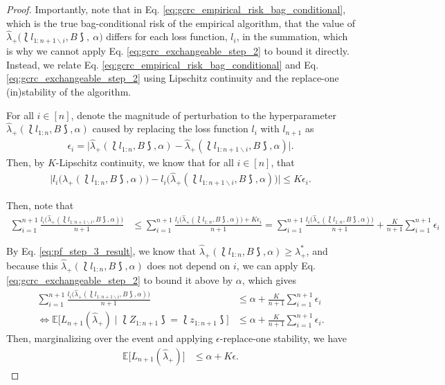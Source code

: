 \begin{proof}
Importantly, note that in Eq. 
\eqref{eq:gcrc_empirical_risk_bag_conditional}, which is the true bag-conditional risk of the empirical algorithm, that the value of $\widehat{\lambda}_+\big(\lbag l_{1:n+1\backslash i}, B  \rbag, \ \alpha\big)$ differs for each loss function, $l_i$, in the summation, which is why we cannot apply Eq. \eqref{eq:gcrc_exchangeable_step_2} to bound it directly. Instead, we relate Eq. \eqref{eq:gcrc_empirical_risk_bag_conditional} and Eq. \eqref{eq:gcrc_exchangeable_step_2} using Lipschitz continuity and the replace-one (in)stability of the algorithm. 



For all $i\in[n]$, denote the magnitude of perturbation to the hyperparameter $\hat\lambda_+(\lbag l_{1:n}, B\rbag, \alpha)$ caused by replacing the loss function $l_i$ with $l_{n+1}$ as 
\begin{align*}
    \epsilon_i = \Big|\hat\lambda_+(\lbag l_{1:n}, B\rbag, \alpha)-\hat\lambda_+(\lbag l_{1:n+1\backslash i}, B\rbag, \alpha)\Big|.
\end{align*}
Then, by $K$-Lipschitz continuity, we know that for all $i\in [n]$, that
\begin{align*}
    \Big|l_i\big(\hat\lambda_+(\lbag l_{1:n}, B\rbag, \alpha)\big) - l_i\big(\hat\lambda_+(\lbag l_{1:n+1\backslash i}, B\rbag, \alpha)\big)\Big| \leq K \epsilon_i.
\end{align*}

Then, note that 
\begin{align*}
    \sum_{i=1}^{n+1}\frac{l_i\big(\hat\lambda_+(\lbag l_{1:n+1\backslash i}, B\rbag, \alpha)\big)}{n+1} & \leq \sum_{i=1}^{n+1}\frac{l_i\big(\hat\lambda_+(\lbag l_{1:n}, B\rbag, \alpha)\big) + K\epsilon_i}{n+1} = \sum_{i=1}^{n+1}\frac{l_i\big(\hat\lambda_+(\lbag l_{1:n}, B\rbag, \alpha)\big)}{n+1} + \frac{K}{n+1}\sum_{i=1}^{n+1}\epsilon_i 
\end{align*}

By Eq. \eqref{eq:pf_step_3_result}, we know that $\hat\lambda_+(\lbag l_{1:n}, B\rbag, \alpha) \geq \lambda_+^*$, and because this $\hat\lambda_+(\lbag l_{1:n}, B\rbag, \alpha)$ does not depend on $i$, we can apply Eq. \eqref{eq:gcrc_exchangeable_step_2} to bound it above by $\alpha$, which gives 
\begin{align*}
     \sum_{i=1}^{n+1}\frac{l_i\big(\hat\lambda_+(\lbag l_{1:n+1\backslash i}, B\rbag, \alpha)\big)}{n+1} & \leq \alpha + \frac{K}{n+1}\sum_{i=1}^{n+1}\epsilon_i \\
     \iff \mathbb{E}\big[L_{n+1}(\hat\lambda_{+}) \mid \lbag Z_{1:n+1} \rbag =  \lbag z_{1:n+1} \rbag\big] & \leq \alpha + \frac{K}{n+1}\sum_{i=1}^{n+1}\epsilon_i.
\end{align*}
Then, marginalizing over the event and applying $\epsilon$-replace-one stability, we have
\begin{align*}
    \mathbb{E}\big[L_{n+1}(\hat\lambda_{+}) \big] & \leq \alpha + K \epsilon.
\end{align*}


\end{proof}
